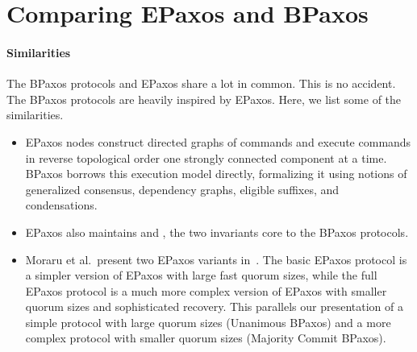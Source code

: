 \section{Comparing EPaxos and BPaxos}
\paragraph{Similarities}
The BPaxos protocols and EPaxos share a lot in common. This is no accident. The
BPaxos protocols are heavily inspired by EPaxos. Here, we list some of the
similarities.
\begin{itemize}
  \item
    EPaxos nodes construct directed graphs of commands and execute commands in
    reverse topological order one strongly connected component at a time.
    BPaxos borrows this execution model directly, formalizing it using notions
    of generalized consensus, dependency graphs, eligible suffixes, and
    condensations.
  \item
    EPaxos also maintains  and
    , the two invariants core to the BPaxos
    protocols.
  \item
    Moraru et al.\ present two EPaxos variants in~\cite{moraru2013there}.  The
    basic EPaxos protocol is a simpler version of EPaxos with large fast quorum
    sizes, while the full EPaxos protocol is a much more complex version of
    EPaxos with smaller quorum sizes and sophisticated recovery. This parallels
    our presentation of a simple protocol with large quorum sizes (Unanimous
    BPaxos) and a more complex protocol with smaller quorum sizes (Majority
    Commit BPaxos).
\end{itemize}

